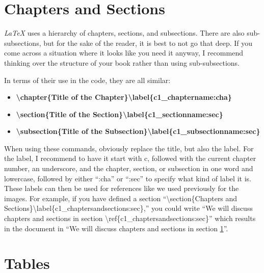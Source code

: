 \section{Chapters and Sections}\label{c1_chaptersandsections:sec}

\textit{LaTeX} uses a hierarchy of chapters, sections, and subsections. There are also sub-subsections, but for the sake of the reader, it is best to not go that deep. If you come across a situation where it looks like you need it anyway, I recommend thinking over the structure of your book rather than using sub-subsections. 

In terms of their use in the code, they are all similar:

\begin{itemize}
    \item \textbf{\textbackslash chapter\{Title of the Chapter\}\textbackslash label\{c1\_chaptername:cha\}}
    \item \textbf{\textbackslash section\{Title of the Section\}\textbackslash label\{c1\_sectionname:sec\}}
    \item \textbf{\textbackslash subsection\{Title of the Subsection\}\textbackslash label\{c1\_subsectionname:sec\}}
\end{itemize}

When using these commands, obviously replace the title, but also the label. For the label, I recommend to have it start with c, followed with the current chapter number, an underscore, and the chapter, section, or subsection in one word and lowercase, followed by either ``:cha'' or ``:sec'' to specify what kind of label it is. These labels can then be used for references like we used previously for the images. For example, if you have defined a section ``\textbackslash section\{Chapters and Sections\}\textbackslash label\{c1\_chaptersandsections:sec\},'' you could write ``We will discuss chapters and sections in section \textbackslash ref\{c1\_chaptersandsections:sec\}'' which results in the document in ``We will discuss chapters and sections in section \ref{c1_chaptersandsections:sec}''.


\section{Tables}\label{c1_tables:sec}

